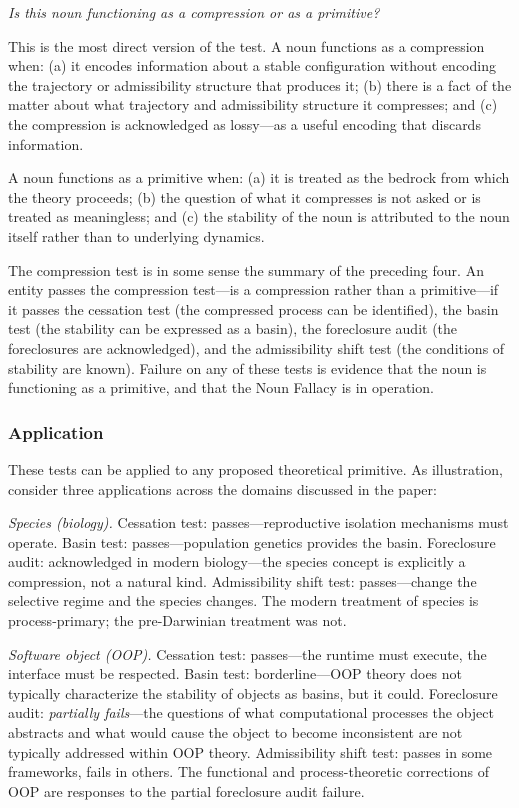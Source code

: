 \documentclass[12pt, a4paper]{article}
\theoremstyle{plain}
\theoremstyle{definition}
\theoremstyle{remark}
\begin{document}
\textit{Is this noun functioning as a compression or as a primitive?}

This is the most direct version of the test. A noun functions as a compression
when: (a) it encodes information about a stable configuration without encoding
the trajectory or admissibility structure that produces it; (b) there is a
fact of the matter about what trajectory and admissibility structure it
compresses; and (c) the compression is acknowledged as lossy---as a useful
encoding that discards information.

A noun functions as a primitive when: (a) it is treated as the bedrock from
which the theory proceeds; (b) the question of what it compresses is not
asked or is treated as meaningless; and (c) the stability of the noun is
attributed to the noun itself rather than to underlying dynamics.

The compression test is in some sense the summary of the preceding four.
An entity passes the compression test---is a compression rather than a
primitive---if it passes the cessation test (the compressed process can be
identified), the basin test (the stability can be expressed as a basin),
the foreclosure audit (the foreclosures are acknowledged), and the
admissibility shift test (the conditions of stability are known). Failure
on any of these tests is evidence that the noun is functioning as a primitive,
and that the Noun Fallacy is in operation.

\subsubsection*{Application}

These tests can be applied to any proposed theoretical primitive. As
illustration, consider three applications across the domains discussed in
the paper:

\textit{Species (biology).} Cessation test: passes---reproductive isolation
mechanisms must operate. Basin test: passes---population genetics provides
the basin. Foreclosure audit: acknowledged in modern biology---the species
concept is explicitly a compression, not a natural kind. Admissibility shift
test: passes---change the selective regime and the species changes. The modern
treatment of species is process-primary; the pre-Darwinian treatment was not.

\textit{Software object (OOP).} Cessation test: passes---the runtime must
execute, the interface must be respected. Basin test: borderline---OOP theory
does not typically characterize the stability of objects as basins, but
it could. Foreclosure audit: \emph{partially fails}---the questions of what
computational processes the object abstracts and what would cause the object
to become inconsistent are not typically addressed within OOP theory.
Admissibility shift test: passes in some frameworks, fails in others.
The functional and process-theoretic corrections of OOP are responses to the
partial foreclosure audit failure.
\end{document}
